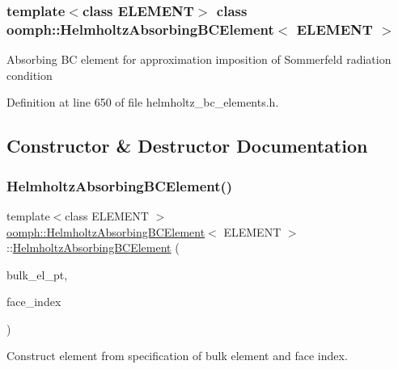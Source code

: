 \subsubsection*{template$<$class E\+L\+E\+M\+E\+NT$>$\newline
class oomph\+::\+Helmholtz\+Absorbing\+B\+C\+Element$<$ E\+L\+E\+M\+E\+N\+T $>$}

Absorbing BC element for approximation imposition of Sommerfeld radiation condition 

Definition at line 650 of file helmholtz\+\_\+bc\+\_\+elements.\+h.



\subsection{Constructor \& Destructor Documentation}
\mbox{\label{classoomph_1_1HelmholtzAbsorbingBCElement_a97854c784c46cae588db1d608f9ac445}} 
\subsubsection{\texorpdfstring{Helmholtz\+Absorbing\+B\+C\+Element()}{HelmholtzAbsorbingBCElement()}}
{\footnotesize\ttfamily template$<$class E\+L\+E\+M\+E\+NT $>$ \\
\hyperlink{classoomph_1_1HelmholtzAbsorbingBCElement}{oomph\+::\+Helmholtz\+Absorbing\+B\+C\+Element}$<$ E\+L\+E\+M\+E\+NT $>$\+::\hyperlink{classoomph_1_1HelmholtzAbsorbingBCElement}{Helmholtz\+Absorbing\+B\+C\+Element} (\begin{DoxyParamCaption}\item[{\hyperlink{classoomph_1_1FiniteElement}{Finite\+Element} $\ast$const \&}]{bulk\+\_\+el\+\_\+pt,  }\item[{const int \&}]{face\+\_\+index }\end{DoxyParamCaption})\hspace{0.3cm}{\ttfamily [inline]}}



Construct element from specification of bulk element and face index. 



